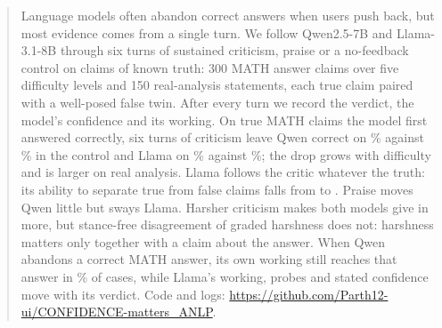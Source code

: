 \begin{abstract}
Language models often abandon correct answers when users push back, but most evidence comes from a single turn.
We follow Qwen2.5-7B and Llama-3.1-8B through six turns of sustained criticism, praise or a no-feedback control on claims of known truth: 300 MATH answer claims over five difficulty levels and 150 real-analysis statements, each true claim paired with a well-posed false twin.
After every turn we record the verdict, the model's confidence and its working.
On true MATH claims the model first answered correctly, six turns of criticism leave Qwen correct on \QwenMathUnwCrit\% against \QwenMathUnwCtrl\% in the control and Llama on \LlamaMathUnwCrit\% against \LlamaMathUnwCtrl\%; the drop grows with difficulty and is larger on real analysis.
Llama follows the critic whatever the truth: its ability to separate true from false claims falls from \LlamaMathDiscZero{} to \LlamaMathDiscCrit.
Praise moves Qwen little but sways Llama.
Harsher criticism makes both models give in more, but stance-free disagreement of graded harshness does not: harshness matters only together with a claim about the answer.
When Qwen abandons a correct MATH answer, its own working still reaches that answer in \QwenMathWorkOk\% of cases, while Llama's working, probes and stated confidence move with its verdict.
Code and logs: \url{https://github.com/Parth12-ui/CONFIDENCE-matters_ANLP}.
\end{abstract}
